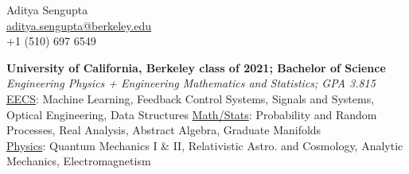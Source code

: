 \documentclass[10pt]{article}
\begin{document}
\begin{flushright}
\parbox[][][c]{0.3\textwidth}{
{\Large Aditya Sengupta}\\
\url{aditya.sengupta@berkeley.edu}\\
 +1 (510) 697 6549
}
\end{flushright}
\textbf{University of California, Berkeley class of 2021; Bachelor of Science}\\
\textit{Engineering Physics + Engineering Mathematics and Statistics; GPA 3.815}\\
\underline{EECS}: Machine Learning, Feedback Control Systems, Signals and Systems, Optical Engineering, Data Structures
\underline{Math/Stats}: Probability and Random Processes, Real Analysis, Abstract Algebra, Graduate Manifolds\\
\underline{Physics}: Quantum Mechanics I \& II, Relativistic Astro. and Cosmology, Analytic Mechanics, Electromagnetism\\
\end{document}
